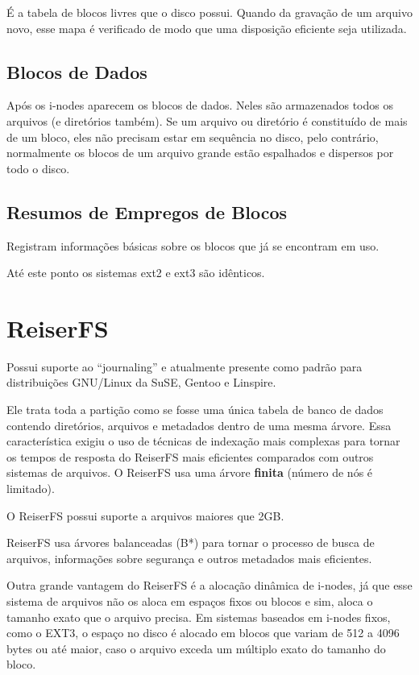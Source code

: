 É a tabela de blocos livres que o disco possui. Quando da gravação de um arquivo novo, esse mapa é verificado de modo que uma disposição eficiente seja utilizada.

\subsection{Blocos de Dados}

Após os i-nodes aparecem os blocos de dados. Neles são armazenados todos os arquivos (e diretórios também). Se um arquivo ou diretório é constituído de mais de um bloco, eles não precisam estar em sequência no disco, pelo contrário, normalmente os blocos de um arquivo grande estão espalhados e dispersos por todo o disco.

\subsection{Resumos de Empregos de Blocos}

Registram informações básicas sobre os blocos que já se encontram em uso.

Até este ponto os sistemas ext2 e ext3 são idênticos.

\section{ReiserFS}

Possui suporte ao ``journaling'' e atualmente presente como padrão para distribuições GNU/Linux da SuSE, Gentoo e Linspire.

Ele trata toda a partição como se fosse uma única tabela de banco de dados contendo diretórios, arquivos e metadados dentro de uma mesma árvore. Essa característica exigiu o uso de técnicas de indexação mais complexas para tornar os tempos de resposta do ReiserFS mais eficientes comparados com outros sistemas de arquivos. O ReiserFS usa uma árvore \textbf{finita} (número de nós é limitado).

O ReiserFS possui suporte a arquivos maiores que 2GB.

ReiserFS usa árvores balanceadas (B*) para tornar o processo de busca de arquivos, informações sobre segurança e outros metadados mais eficientes.

Outra grande vantagem do ReiserFS é a alocação dinâmica de i-nodes, já que esse sistema de arquivos não os aloca em espaços fixos ou blocos e sim, aloca o tamanho exato que o arquivo precisa. Em sistemas baseados em i-nodes fixos, como o EXT3, o espaço no disco é alocado em blocos que variam de 512 a 4096 bytes ou até maior, caso o arquivo exceda um múltiplo exato do tamanho do bloco.

